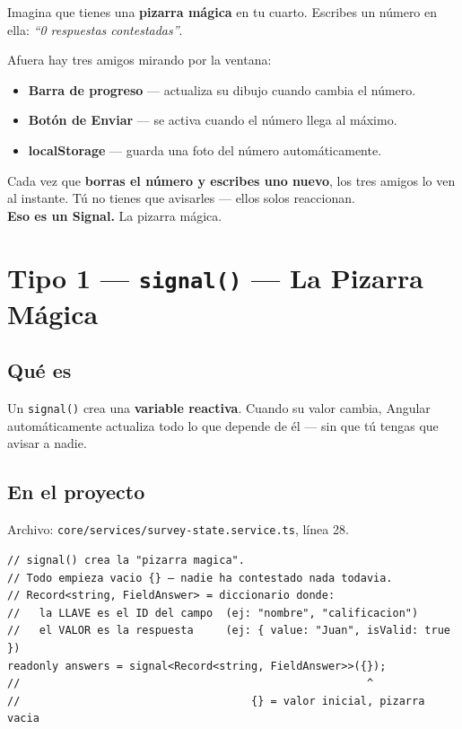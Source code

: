 \documentclass[12pt, a4paper]{article}
\begin{document}
\begin{tcolorbox}[analogia, title={\emoji{magic-wand} La Pizarra Mágica}]
Imagina que tienes una \textbf{pizarra mágica} en tu cuarto.
Escribes un número en ella: \textit{``0 respuestas contestadas''}.

Afuera hay tres amigos mirando por la ventana:

\begin{itemize}
  \item {} \textbf{Barra de progreso} — actualiza su dibujo cuando cambia el número.
  \item {} \textbf{Botón de Enviar} — se activa cuando el número llega al máximo.
  \item {} \textbf{localStorage} — guarda una foto del número automáticamente.
\end{itemize}

Cada vez que \textbf{borras el número y escribes uno nuevo}, los tres amigos lo ven al instante.
Tú no tienes que avisarles — ellos solos reaccionan.\\[0.3cm]

\textbf{Eso es un Signal.} La pizarra mágica.
\end{tcolorbox}

\section{ Tipo 1 — \texttt{signal()} — La Pizarra Mágica}

\subsection{Qué es}

Un \texttt{signal()} crea una \textbf{variable reactiva}. Cuando su valor cambia,
Angular automáticamente actualiza todo lo que depende de él — sin que tú
tengas que avisar a nadie.

\subsection{ En el proyecto}

Archivo: \textcolor{morado}{\texttt{core/services/survey-state.service.ts}}, línea 28.

\begin{lstlisting}
// signal() crea la "pizarra magica".
// Todo empieza vacio {} — nadie ha contestado nada todavia.
// Record<string, FieldAnswer> = diccionario donde:
//   la LLAVE es el ID del campo  (ej: "nombre", "calificacion")
//   el VALOR es la respuesta     (ej: { value: "Juan", isValid: true })
readonly answers = signal<Record<string, FieldAnswer>>({});
//                                                      ^
//                                    {} = valor inicial, pizarra vacia
\end{lstlisting}
\end{document}
